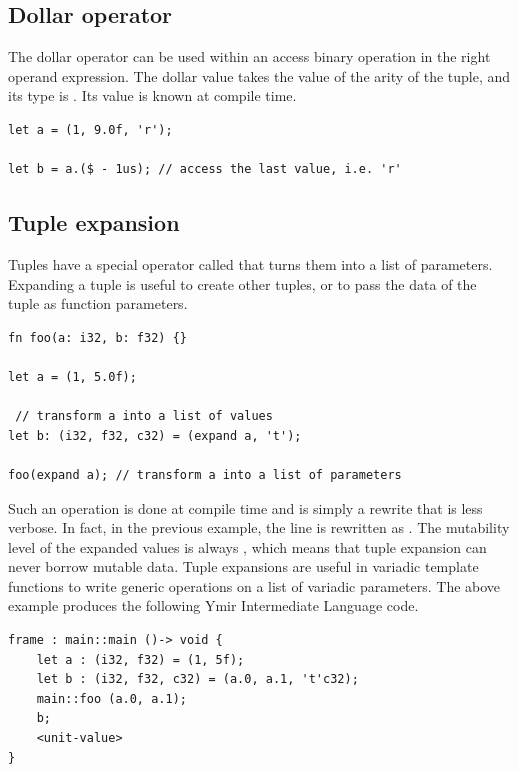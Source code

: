 \subsection{Dollar operator}

The dollar operator can be used within an access binary operation in the right
operand expression. The dollar value takes the value of the arity of the tuple,
and its type is . Its value is known at compile time.

\begin{lstlisting}[style=coloredverbatim]
let a = (1, 9.0f, 'r');

let b = a.($ - 1us); // access the last value, i.e. 'r'
\end{lstlisting}

\subsection{Tuple expansion}

Tuples have a special operator called  that turns them into a
list of parameters. Expanding a tuple is useful to create other tuples, or to
pass the data of the tuple as function parameters.

\begin{lstlisting}[style=coloredverbatim]
fn foo(a: i32, b: f32) {}

let a = (1, 5.0f);

 // transform a into a list of values
let b: (i32, f32, c32) = (expand a, 't');

foo(expand a); // transform a into a list of parameters
\end{lstlisting}

Such an operation is done at compile time and is simply a rewrite that is less
verbose. In fact, in the previous example, the line  is
rewritten as . The mutability level of the expanded
values is always , which means that tuple expansion can never borrow
mutable data. Tuple expansions are useful in variadic template functions to
write generic operations on a list of variadic parameters. The above example produces the following Ymir Intermediate Language code.

\begin{lstlisting}[style=myilVerb]
frame : main::main ()-> void {
    let a : (i32, f32) = (1, 5f);
    let b : (i32, f32, c32) = (a.0, a.1, 't'c32);
    main::foo (a.0, a.1);
    b;
    <unit-value>
}
\end{lstlisting}

